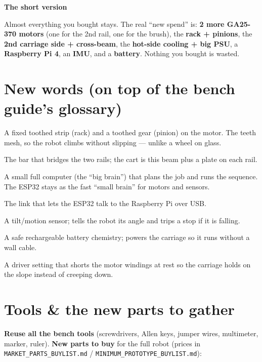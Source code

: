 \documentclass[11pt,a4paper]{article}
\newenvironment{tipbox}[1]
  {\par\medskip\noindent\begin{lrbox}{\gbbox}\begin{minipage}{0.95\linewidth}\footnotesize\textbf{#1}\par\smallskip}
  {\end{minipage}\end{lrbox}\setlength{\fboxsep}{8pt}\fcolorbox{green!45!black}{green!5}{\usebox{\gbbox}}\par\medskip}
\begin{document}
\begin{tipbox}{The short version}
Almost everything you bought stays. The real ``new spend'' is: \textbf{2 more GA25-370 motors} (one for
the 2nd rail, one for the brush), the \textbf{rack + pinions}, the \textbf{2nd carriage side + cross-beam},
the \textbf{hot-side cooling + big PSU}, a \textbf{Raspberry Pi 4}, an \textbf{IMU}, and a \textbf{battery}.
Nothing you bought is wasted.
\end{tipbox}

\section{New words (on top of the bench guide's glossary)}

\begin{description}[leftmargin=2.4cm,style=nextline,itemsep=2pt]
  \item[Rack \& pinion] A fixed toothed strip (rack) and a toothed gear (pinion) on the motor. The teeth
  mesh, so the robot climbs without slipping --- unlike a wheel on glass.
  \item[Gantry / cross-beam] The bar that bridges the two rails; the cart is this beam plus a plate on
  each rail.
  \item[Raspberry Pi 4] A small full computer (the ``big brain'') that plans the job and runs the
  sequence. The ESP32 stays as the fast ``small brain'' for motors and sensors.
  \item[micro-ROS] The link that lets the ESP32 talk to the Raspberry Pi over USB.
  \item[IMU (MPU-6050)] A tilt/motion sensor; tells the robot its angle and trips a stop if it is falling.
  \item[LiFePO\textsubscript{4} battery] A safe rechargeable battery chemistry; powers the carriage so it
  runs without a wall cable.
  \item[Brake mode] A driver setting that shorts the motor windings at rest so the carriage holds on the
  slope instead of creeping down.
\end{description}

\section{Tools \& the new parts to gather}

\textbf{Reuse all the bench tools} (screwdrivers, Allen keys, jumper wires, multimeter, marker, ruler).
\textbf{New parts to buy} for the full robot (prices in \texttt{MARKET\_PARTS\_BUYLIST.md} /
\texttt{MINIMUM\_PROTOTYPE\_BUYLIST.md}):
\end{document}
